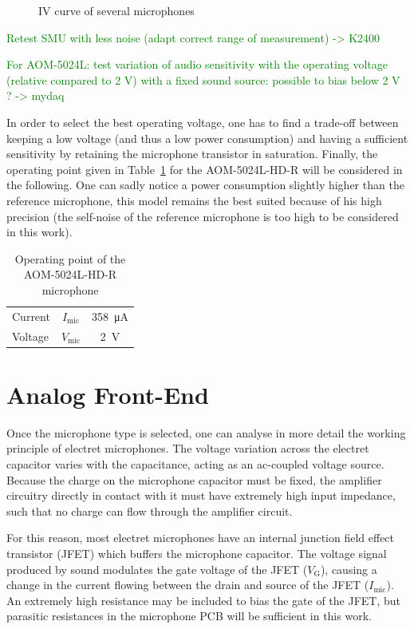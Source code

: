 \documentclass{EPL-master-thesis-covers-EN}
\newcommand{\te}[1]{\textrm{#1}}
\begin{document}
\begin{figure}[H]
    \centering
    
    \caption{IV curve of several microphones}
    \label{fig:IV_mic}
\end{figure}

\textcolor{green}{Retest SMU with less noise (adapt correct range of measurement) -> K2400}

\textcolor{green}{For AOM-5024L: test variation of audio sensitivity with the operating voltage (relative compared to 2 V) with a fixed sound source: possible to bias below 2 V ? -> mydaq}

In order to select the best operating voltage, one has to find a trade-off between keeping a low voltage (and thus a low power consumption) and having a sufficient sensitivity by retaining the microphone transistor in saturation. Finally, the operating point given in Table~\ref{tab:op_point_mic} for the AOM-5024L-HD-R will be considered in the following. One can sadly notice a power consumption slightly higher than the reference microphone, this model remains the best suited because of his high precision (the self-noise of the reference microphone is too high to be considered in this work).

\begin{table}[H]
\centering
\begin{tabular}{lcc}
\hline
 Current & $I_{\te{mic}}$   & \SI{358}{\micro A} \\
 Voltage & $V_{\te{mic}}$   & \SI{2}{V}          \\ \hline
\end{tabular}
\caption{Operating point of the AOM-5024L-HD-R microphone}
\label{tab:op_point_mic}
\end{table}

\section{Analog Front-End}

Once the microphone type is selected, one can analyse in more detail the working principle of electret microphones.
The voltage variation across the electret capacitor varies with the capacitance, acting as an ac-coupled voltage source. Because the charge on the microphone capacitor must be fixed, the amplifier circuitry directly in contact with it must have extremely high input impedance, such that no charge can flow through the amplifier circuit. 

For this reason, most electret microphones have an internal junction field effect transistor (JFET) which buffers the microphone capacitor. The voltage signal produced by sound modulates the gate voltage of the JFET ($V_\te{G}$), causing a change in the current flowing between the drain and source of the JFET ($I_{\te{mic}}$). An extremely high resistance may be included to bias the gate of the JFET, but parasitic resistances in the microphone PCB will be sufficient in this work.
\end{document}
